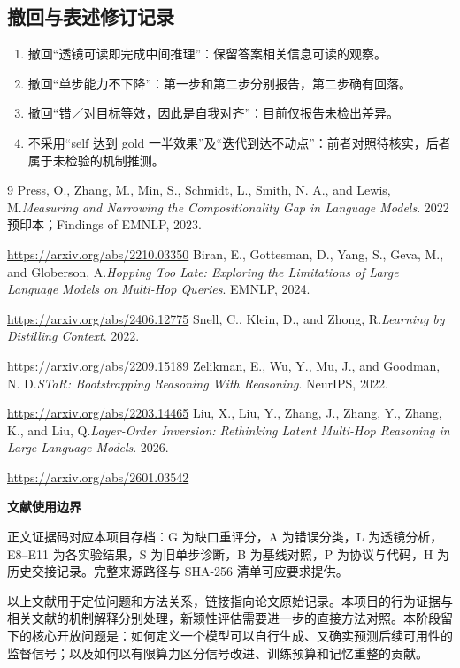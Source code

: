 \documentclass[11pt,a4paper]{article}
\begin{document}
\subsection{撤回与表述修订记录}
\begin{enumerate}\small
\item 撤回“透镜可读即完成中间推理”：保留答案相关信息可读的观察。
\item 撤回“单步能力不下降”：第一步和第二步分别报告，第二步确有回落。
\item 撤回“错／对目标等效，因此是自我对齐”：目前仅报告未检出差异。
\item 不采用“self 达到 gold 一半效果”及“迭代到达不动点”：前者对照待核实，后者属于未检验的机制推测。
\end{enumerate}
\clearpage
\normalsize
\begin{thebibliography}{9}
 Press, O., Zhang, M., Min, S., Schmidt, L., Smith, N. A., and Lewis, M.\quad \emph{Measuring and Narrowing the Compositionality Gap in Language Models}. 2022 预印本；Findings of EMNLP, 2023.\par\url{https://arxiv.org/abs/2210.03350}
 Biran, E., Gottesman, D., Yang, S., Geva, M., and Globerson, A.\quad \emph{Hopping Too Late: Exploring the Limitations of Large Language Models on Multi-Hop Queries}. EMNLP, 2024.\par\url{https://arxiv.org/abs/2406.12775}
 Snell, C., Klein, D., and Zhong, R.\quad \emph{Learning by Distilling Context}. 2022.\par\url{https://arxiv.org/abs/2209.15189}
 Zelikman, E., Wu, Y., Mu, J., and Goodman, N. D.\quad \emph{STaR: Bootstrapping Reasoning With Reasoning}. NeurIPS, 2022.\par\url{https://arxiv.org/abs/2203.14465}
 Liu, X., Liu, Y., Zhang, J., Zhang, Y., Zhang, K., and Liu, Q.\quad \emph{Layer-Order Inversion: Rethinking Latent Multi-Hop Reasoning in Large Language Models}. 2026.\par\url{https://arxiv.org/abs/2601.03542}
\end{thebibliography}
\vspace{5mm}
\noindent\textbf{文献使用边界}\par
正文证据码对应本项目存档：G 为缺口重评分，A 为错误分类，L 为透镜分析，E8--E11 为各实验结果，S 为旧单步诊断，B 为基线对照，P 为协议与代码，H 为历史交接记录。完整来源路径与 SHA-256 清单可应要求提供。

以上文献用于定位问题和方法关系，链接指向论文原始记录。本项目的行为证据与相关文献的机制解释分别处理，新颖性评估需要进一步的直接方法对照。本阶段留下的核心开放问题是：如何定义一个模型可以自行生成、又确实预测后续可用性的监督信号；以及如何以有限算力区分信号改进、训练预算和记忆重整的贡献。
\vfill
{}
\end{document}

